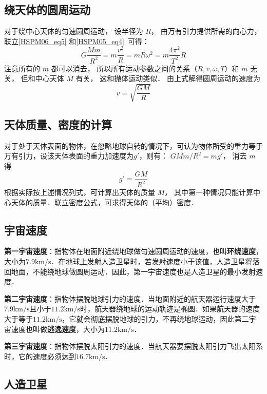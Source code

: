 \subsection{绕天体的圆周运动}

对于绕中心天体的匀速圆周运动， 设半径为 $R$， 由万有引力提供所需的向心力， 联立\autoref{HSPM06_eq5} 和\autoref{HSPM05_eq4}~可得：
\begin{equation}
G\frac{Mm}{R^2}=m\frac{v^2}{R}=mR\omega^2=m\frac{4\pi^2}{T^2}R
\end{equation}
注意所有的 $m$ 都可以消去， 所以所有运动参数之间的关系（$R,v,\omega,T$）和 $m$ 无关， 但和中心天体 $M$ 有关， 这和抛体运动类似． 由上式解得圆周运动的速度为
\begin{equation}
v = \sqrt{\frac{GM}{R}}
\end{equation}

\subsection{天体质量、密度的计算}

对于处于天体表面的物体，在忽略地球自转的情况下，可认为物体所受的重力等于万有引力，设该天体表面的重力加速度为$g'$，则有： $GMm/R^2=mg'$， 消去 $m$ 得
\begin{equation}
g' = \frac{GM}{R^2}
\end{equation}
根据实际按上述情况列式，可计算出天体的质量 $M$， 其中第一种情况只能计算中心天体的质量．联立密度公式，可求得天体的（平均）密度．

\subsection{宇宙速度}

\textbf{第一宇宙速度}：指物体在地面附近绕地球做匀速圆周运动的速度，也叫\textbf{环绕速度}，大小为$7.9\mathrm{km/s}$．在地球上发射人造卫星时，若发射速度小于该值，人造卫星将落回地面，不能绕地球做圆周运动．因此，第一宇宙速度也是人造卫星的最小发射速度．

\textbf{第二宇宙速度}：指物体摆脱地球引力的速度．当地面附近的航天器运行速度大于$7.9\mathrm{km/s}$且小于$11.2\mathrm{km/s}$时，航天器绕地球的运动轨迹是椭圆．如果航天器的速度大于等于$11.2\mathrm{km/s}$，它就会彻底摆脱地球的引力，不再绕地球运动，因此第二宇宙速度也叫做\textbf{逃逸速度}，大小为$11.2\mathrm{km/s}$．

\textbf{第三宇宙速度}：指物体摆脱太阳引力的速度．当航天器要摆脱太阳引力飞出太阳系时，它的速度必须达到$16.7\mathrm{km/s}$．

\subsection{人造卫星}

